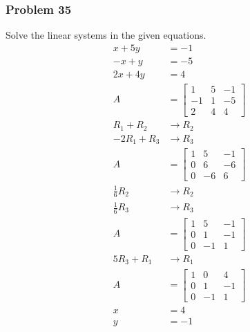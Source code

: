 \documentclass[letterpaper, 12pt]{math}
\begin{document}
\subsubsection*{Problem 35}
Solve the linear systems in the given equations.
\begin{align*}
  x+5y &= -1 \\
  -x+y &= -5 \\
  2x+4y &= 4 \\
  A &= \left[\begin{array}{cc|c}
    1 & 5 & -1 \\
    -1 & 1 & -5 \\
    2 & 4 & 4
  \end{array}\right] \\
  R_1+R_2 &\to R_2 \\
  -2R_1+R_3 &\to R_3 \\
  A &= \left[\begin{array}{cc|c}
    1 & 5 & -1 \\
    0 & 6 & -6 \\
    0 & -6 & 6
  \end{array}\right] \\
  \frac{1}{6}R_2 &\to R_2 \\
  \frac{1}{6}R_3 &\to R_3 \\
  A &= \left[\begin{array}{cc|c}
    1 & 5 & -1 \\
    0 & 1 & -1 \\
    0 & -1 & 1
  \end{array}\right] \\
  5R_3+R_1 &\to R_1 \\
  A &= \left[\begin{array}{cc|c}
    1 & 0 & 4 \\
    0 & 1 & -1 \\
    0 & -1 & 1
  \end{array}\right] \\
  x &= 4 \\
  y &= -1
\end{align*}
\end{document}
